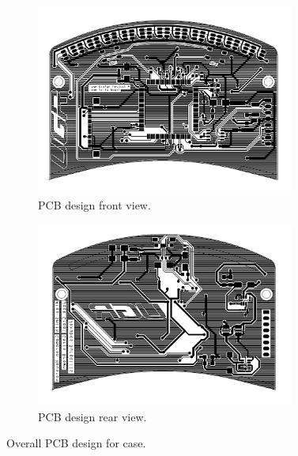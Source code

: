 \begin{figure}[H]
\centering
\begin{subfigure}{.5\textwidth}
  \centering
  \includegraphics[width=8.5cm]{Figures/PCB_front.png}
  \caption{PCB design front view.}
  \label{fig:PCB_front}
\end{subfigure}%
\begin{subfigure}{.5\textwidth}
  \centering
  \includegraphics[width=8.5cm]{Figures/PCB_back.png}
  \caption{PCB design rear view.}
  \label{fig:PCB_back}
\end{subfigure}
\caption{Overall PCB design for case.}
\label{fig:PCB}
\end{figure}